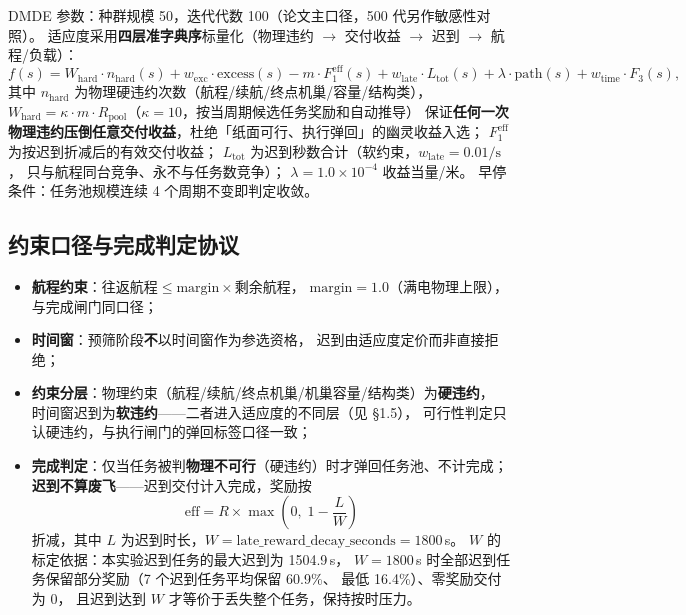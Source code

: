 \documentclass[a4paper,11pt]{article}
\begin{document}
DMDE 参数：种群规模 50，迭代代数 100（论文主口径，500 代另作敏感性对照）。
适应度采用\textbf{四层准字典序}标量化（物理违约 $\to$ 交付收益 $\to$ 迟到 $\to$ 航程/负载）：
\[
  f(s) = W_{\mathrm{hard}}\cdot n_{\mathrm{hard}}(s)
       + w_{\mathrm{exc}}\cdot \mathrm{excess}(s)
       - m\cdot F_1^{\mathrm{eff}}(s)
       + w_{\mathrm{late}}\cdot L_{\mathrm{tot}}(s)
       + \lambda\cdot \mathrm{path}(s)
       + w_{\mathrm{time}}\cdot F_3(s),
\]
其中 $n_{\mathrm{hard}}$ 为物理硬违约次数（航程/续航/终点机巢/容量/结构类），
$W_{\mathrm{hard}}=\kappa\cdot m\cdot R_{\mathrm{pool}}$（$\kappa=10$，按当周期候选任务奖励和自动推导）
保证\textbf{任何一次物理违约压倒任意交付收益}，杜绝「纸面可行、执行弹回」的幽灵收益入选；
$F_1^{\mathrm{eff}}$ 为按迟到折减后的有效交付收益；
$L_{\mathrm{tot}}$ 为迟到秒数合计（软约束，$w_{\mathrm{late}}=0.01/\mathrm{s}$，
只与航程同台竞争、永不与任务数竞争）；
$\lambda = 1.0\times10^{-4}$ 收益当量/米。
早停条件：任务池规模连续 4 个周期不变即判定收敛。

\subsection{约束口径与完成判定协议}

\begin{itemize}
  \item \textbf{航程约束}：$\text{往返航程} \le \text{margin}\times\text{剩余航程}$，
        $\text{margin}=1.0$（满电物理上限），与完成闸门同口径；
  \item \textbf{时间窗}：预筛阶段\textbf{不}以时间窗作为参选资格，
        迟到由适应度定价而非直接拒绝；
  \item \textbf{约束分层}：物理约束（航程/续航/终点机巢/机巢容量/结构类）为\textbf{硬违约}，
        时间窗迟到为\textbf{软违约}——二者进入适应度的不同层（见 \S 1.5），
        可行性判定只认硬违约，与执行闸门的弹回标签口径一致；
  \item \textbf{完成判定}：仅当任务被判\textbf{物理不可行}（硬违约）时才弹回任务池、不计完成；
        \textbf{迟到不算废飞}——迟到交付计入完成，奖励按
        \[
          \text{eff} = R \times \max\!\left(0,\; 1 - \frac{L}{W}\right)
        \]
        折减，其中 $L$ 为迟到时长，$W=\text{late\_reward\_decay\_seconds}=1800$\,s。
        $W$ 的标定依据：本实验迟到任务的最大迟到为 1504.9\,s，
        $W=1800$\,s 时全部迟到任务保留部分奖励（7 个迟到任务平均保留 60.9\%、
        最低 16.4\%）、零奖励交付为 0，
        且迟到达到 $W$ 才等价于丢失整个任务，保持按时压力。
\end{itemize}
\end{document}
